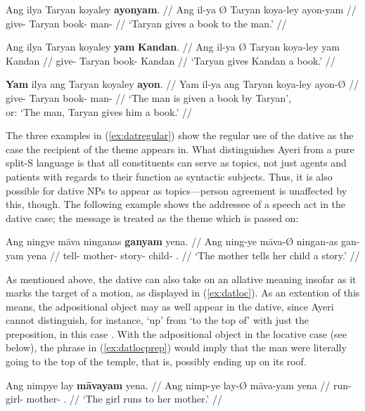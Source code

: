 \pex\label{ex:datregular}
\a\begingl
	\gla Ang ilya {} Taryan koyaley \textbf{ayonyam}. //
	\glb Ang il-ya Ø Taryan koya-ley ayon-yam //
	\glc \AgtT{} give-\TsgM{} \Top{} Taryan book-\PargI{} 
		man-\Dat{} //
	\glft `Taryan gives a book to the man.' //
\endgl

\a\begingl
	\gla Ang ilya {} Taryan koyaley \textbf{yam} \textbf{Kandan}. //
	\glb Ang il-ya Ø Taryan koya-ley yam Kandan //
	\glc \AgtT{} give-\TsgM{} \Top{} Taryan book-\PargI{} \Dat{} Kandan //
	\glft `Taryan gives Kandan a book.' //
\endgl

\a\begingl
	\gla \textbf{Yam} ilya ang Taryan koyaley \textbf{ayon}. //
	\glb Yam il-ya ang Taryan koya-ley ayon-Ø //
	\glc \DatT{} give-\TsgM{} \Aarg{} Taryan book-\PargI{} man-\Top{} //
	\glft `The man is given a book by Taryan',\\
		or: `The man, Taryan gives him a book.' //
\endgl

\xe

The three examples in (\ref{ex:datregular}) show the regular use of the dative 
as the case the recipient of the theme appears in. What distinguishes Ayeri 
from a pure split-S language is that all constituents can serve as topics, not 
just agents and patients with regards to their function as syntactic subjects. 
Thus, it is also possible for dative NPs to appear as topics---person 
agreement is unaffected by this, though. The following example shows the 
addressee of a speech act in the dative case; the message is treated as the 
theme which is passed on:

\ex
\begingl
	\gla Ang ningye māva ninganas \textbf{ganyam} yena. //
	\glb Ang ning-ye māva-Ø ningan-as gan-yam yena //
	\glc \AgtT{} tell-\TsgF{} mother-\Top{} story-\Parg{} 
		child-\Dat{} \TsgF{}.\Gen{} //
	\glft `The mother tells her child a story.' //
\endgl
\xe

As mentioned above, the dative can also take on an allative meaning insofar as
it marks the target of a motion, as displayed in (\ref{ex:datloc}). As an
extention of this means, the adpositional object may as well appear in the
dative, since Ayeri cannot distinguish, for instance, `up' from `to the top of'
with just the preposition, in this case . With the
adpositional object in the locative case (see below), the phrase in
(\ref{ex:datlocprep}) would imply that the man were literally going to the top
of the temple, that is, possibly ending up on its roof.

\pex
\a\label{ex:datloc}\begingl
	\gla Ang nimpye lay \textbf{māvayam} yena. //
	\glb Ang nimp-ye lay-Ø māva-yam yena //
	\glc \AgtT{} run-\TsgF{} girl-\Top{} mother-\Dat{} \TsgF{}.\Gen{} //
	\glft `The girl runs to her mother.' //
\endgl

